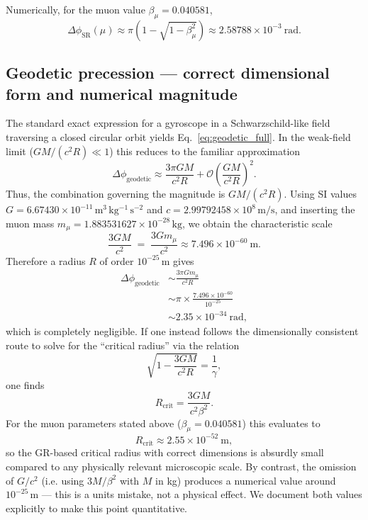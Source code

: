 \documentclass[%
 reprint,
 amsmath,amssymb,
 aps,
]{revtex4-1}
\numberwithin{equation}{section}%
\begin{document}
Numerically, for the muon value $\beta_{\mu}=0.040581$,
\begin{equation}
\Delta\phi_{\mathrm{SR}}(\mu) \approx \pi\left(1-\sqrt{1-\beta_{\mu}^{2}}\right)
\approx 2.58788\times 10^{-3}\ \text{rad}.
\label{eq:delta_phi_SR_mu_num}
\end{equation}

\subsection{Geodetic precession --- correct dimensional form and numerical magnitude}

The standard exact expression for a gyroscope in a Schwarzschild-like field traversing a closed circular orbit yields Eq.~\eqref{eq:geodetic_full}. In the weak-field limit ($GM/(c^{2}R)\ll1$) this reduces to the familiar approximation
\begin{equation}
\Delta\phi_{\mathrm{geodetic}}\approx \frac{3\pi GM}{c^{2}R} + \mathcal{O}\!\left(\frac{GM}{c^{2}R}\right)^{2}.
\label{eq:geodetic_weak}
\end{equation}
Thus, the combination governing the magnitude is $GM/(c^{2}R)$. Using SI values $G=6.67430\times10^{-11}\,\mathrm{m^{3}\,kg^{-1}\,s^{-2}}$ and $c=2.99792458\times10^{8}\,\mathrm{m/s}$, and inserting the muon mass $m_{\mu}=1.883531627\times10^{-28}\,\mathrm{kg}$, we obtain the characteristic scale
\begin{equation}
\frac{3GM}{c^{2}} \;=\; \frac{3Gm_{\mu}}{c^{2}} \approx 7.496\times10^{-60}\ \mathrm{m}.
\end{equation}
Therefore a radius $R$ of order $10^{-25}\,\mathrm{m}$ gives
\begin{align}
\Delta\phi_{\mathrm{geodetic}} &\sim \frac{3\pi G m_\mu}{c^{2} R} \\
&\sim \pi\times\frac{7.496\times10^{-60}}{10^{-25}} \\
&\sim 2.35\times10^{-34}\ \mathrm{rad},
\end{align}
which is completely negligible. If one instead follows the dimensionally consistent route to solve for the ``critical radius'' via the relation
\begin{equation}
\sqrt{1-\frac{3GM}{c^{2}R}}=\frac{1}{\gamma},
\label{eq:crit_condition_dim}
\end{equation}
one finds
\begin{equation}
R_{\text{crit}}=\frac{3GM}{c^{2}\beta^{2}}.
\label{eq:Rcrit_withG}
\end{equation}
For the muon parameters stated above ($\beta_{\mu}=0.040581$) this evaluates to
\begin{equation}
R_{\text{crit}} \approx 2.55\times 10^{-52}\ \mathrm{m},
\label{eq:Rcrit_withG_num}
\end{equation}
so the GR-based critical radius with correct dimensions is absurdly small compared to any physically relevant microscopic scale. By contrast, the omission of $G/c^{2}$ (i.e. using $3M/\beta^{2}$ with $M$ in kg) produces a numerical value around $10^{-25}\,\mathrm{m}$ — this is a units mistake, not a physical effect. We document both values explicitly to make this point quantitative.
\end{document}

